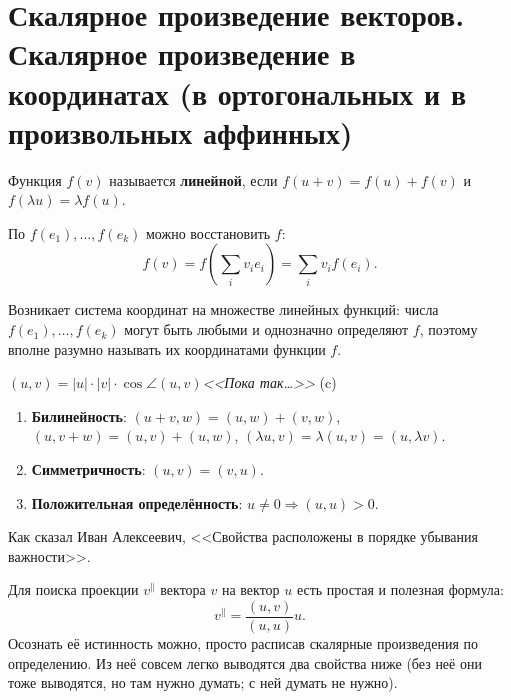 \section{Скалярное произведение векторов. Скалярное произведение в координатах (в ортогональных и в произвольных аффинных)}

\begin{definition}
    Функция $f(v)$ называется \textbf{линейной}, если $f(u + v) = f(u) + f(v)$ и $f(\lambda u) = \lambda f(u)$.
\end{definition}

По $f(e_1), \ldots, f(e_k)$ можно восстановить $f$:
$$f(v) = f\left(\sum_iv_ie_i\right) = \sum_iv_if(e_i).$$

Возникает система координат на множестве линейных функций: числа $f(e_1), \ldots, f(e_k)$ могут быть любыми и однозначно определяют $f$, поэтому вполне разумно называть их координатами функции $f$.

\begin{definition}
    $(u, v) = |u| \cdot |v| \cdot \cos\angle(u, v)$\hfill\textit{<<Пока так\ldots>>} (c)
\end{definition}

\begin{statement}

    \begin{enumerate}
        \item \textbf{Билинейность}: $(u + v, w) = (u, w) + (v, w)$, $(u, v + w) = (u, v) + (u, w)$, $(\lambda u, v) = \lambda (u, v) = (u, \lambda v)$.
        \item \textbf{Симметричность}: $(u, v) = (v, u)$.
        \item \textbf{Положительная определённость}: $u \ne 0 \Rightarrow (u, u) > 0$.
    \end{enumerate}

    Как сказал Иван Алексеевич, <<Свойства расположены в порядке убывания важности>>.
\end{statement}


\begin{orangebox}
    Для поиска проекции $v^\parallel$ вектора $v$ на вектор $u$ есть простая и полезная формула:
    $$v^\parallel = \frac{(u, v)}{(u, u)}u.$$
    Осознать её истинность можно, просто расписав скалярные произведения по определению. Из неё совсем легко выводятся два свойства ниже (без неё они тоже выводятся, но там нужно думать; с ней думать не нужно).
\end{orangebox}

